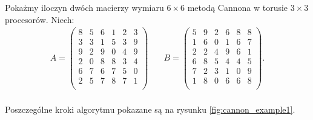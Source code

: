 \begin{przyklad}\label{ex:cannon_1}
Pokażmy iloczyn dwóch macierzy wymiaru \(6 \times 6\) metodą Cannona w torusie \(3\times 3\) procesorów. Niech:
\begin{align*}
A=
\begin{pmatrix}
        8 & 5 & 6 & 1 & 2 & 3 \\
        3 & 3 & 1 & 5 & 3 & 9 \\ 
        9 & 2 & 9 & 0 & 4 & 9 \\ 
        2 & 0 & 8 & 8 & 3 & 4 \\ 
        6 & 7 & 6 & 7 & 5 & 0 \\ 
        2 & 5 & 7 & 8 & 7 & 1 \\
\end{pmatrix} & \quad 
B=
\begin{pmatrix}
        5 & 9 & 2 & 6 & 8 & 8 \\
        1 & 6 & 0 & 1 & 6 & 7 \\ 
        2 & 2 & 4 & 9 & 6 & 1 \\ 
        6 & 8 & 5 & 4 & 4 & 5 \\ 
        7 & 2 & 3 & 1 & 0 & 9 \\ 
        1 & 8 & 0 & 6 & 6 & 8 \\
\end{pmatrix}.\\
\end{align*}


\noindent Poszczególne kroki algorytmu pokazane są na rysunku \ref{fig:cannon_example1}.



\end{przyklad}
